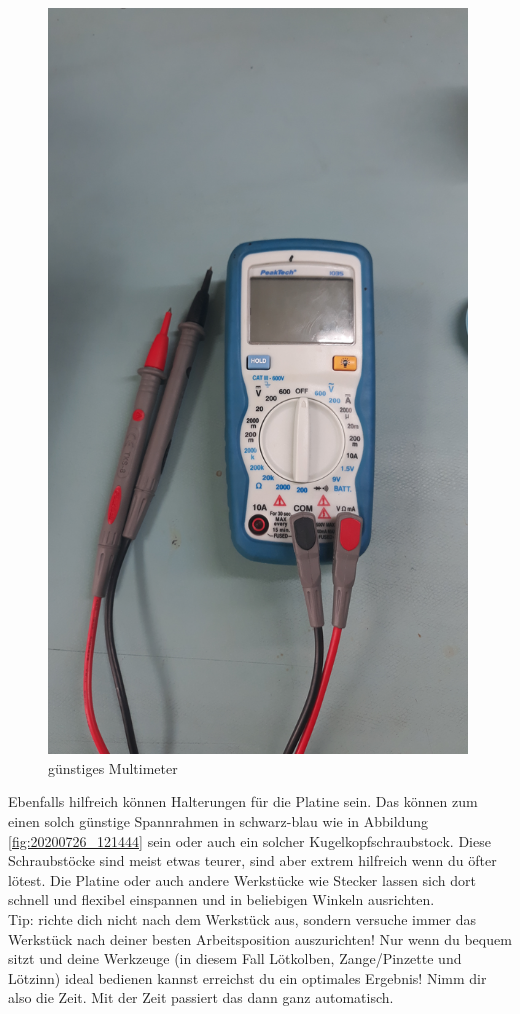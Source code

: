 \documentclass[12pt, a4paper]{article}		%
\begin{document}
\begin{figure}[H]
	\centering
		\includegraphics[width=0.99\textwidth]{Grafiken/20200726_121402.jpg}
	\caption{günstiges Multimeter}
	\label{fig:20200726_121402}
\end{figure}

Ebenfalls hilfreich können Halterungen für die Platine sein. Das können zum einen solch günstige Spannrahmen in schwarz-blau wie in Abbildung \ref{fig:20200726_121444} sein oder auch ein solcher Kugelkopfschraubstock. Diese Schraubstöcke sind meist etwas teurer, sind aber extrem hilfreich wenn du öfter lötest. Die Platine oder auch andere Werkstücke wie Stecker lassen sich dort schnell und flexibel einspannen und in beliebigen Winkeln ausrichten. \\ \newline
Tip: richte dich nicht nach dem Werkstück aus, sondern versuche immer das Werkstück nach deiner besten Arbeitsposition auszurichten! Nur wenn du bequem sitzt und deine Werkzeuge (in diesem Fall Lötkolben, Zange/Pinzette und Lötzinn) ideal bedienen kannst erreichst du ein optimales Ergebnis! Nimm dir also die Zeit. Mit der Zeit passiert das dann ganz automatisch.
\end{document}
